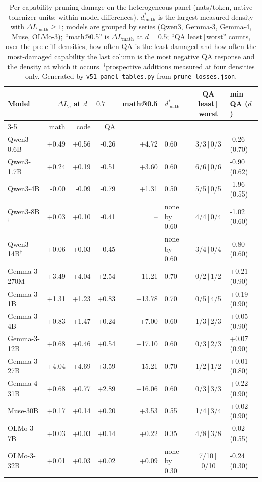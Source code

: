 \begin{table}[t]\centering\footnotesize\setlength{\tabcolsep}{3.5pt}
\begin{tabular}{@{}lrrrrlcl@{}}
\toprule
Model & \multicolumn{3}{c}{$\Delta L_c$ at $d=0.7$} & math@0.5 & $d^{*}_{\mathrm{math}}$ & QA least$\,|\,$worst & min QA ($d$) \\
\cmidrule(lr){3-5} & math & code & QA & & & & \\
\midrule
Qwen3-0.6B & +0.49 & +0.56 & -0.26 & +4.72 & 0.60 & 3/3$\,|\,$0/3 & -0.26 (0.70) \\
Qwen3-1.7B & +0.24 & +0.19 & -0.51 & +3.60 & 0.60 & 6/6$\,|\,$0/6 & -0.90 (0.62) \\
Qwen3-4B & -0.00 & -0.09 & -0.79 & +1.31 & 0.50 & 5/5$\,|\,$0/5 & -1.96 (0.55) \\
Qwen3-8B$^{\dagger}$ & +0.03 & +0.10 & -0.41 & -- & none by 0.60 & 4/4$\,|\,$0/4 & -1.02 (0.60) \\
Qwen3-14B$^{\dagger}$ & +0.06 & +0.03 & -0.45 & -- & none by 0.60 & 3/4$\,|\,$0/4 & -0.80 (0.60) \\
Gemma-3-270M & +3.49 & +4.04 & +2.54 & +11.21 & 0.70 & 0/2$\,|\,$1/2 & +0.21 (0.90) \\
Gemma-3-1B & +1.31 & +1.23 & +0.83 & +13.78 & 0.70 & 0/5$\,|\,$4/5 & +0.19 (0.90) \\
Gemma-3-4B & +0.83 & +1.47 & +0.24 & +7.00 & 0.60 & 1/3$\,|\,$2/3 & +0.05 (0.90) \\
Gemma-3-12B & +0.68 & +0.46 & +0.54 & +17.10 & 0.60 & 0/3$\,|\,$2/3 & +0.07 (0.90) \\
Gemma-3-27B & +4.04 & +4.69 & +3.59 & +15.21 & 0.70 & 1/2$\,|\,$1/2 & +0.01 (0.80) \\
Gemma-4-31B & +0.68 & +0.77 & +2.89 & +16.06 & 0.60 & 0/3$\,|\,$3/3 & +0.22 (0.90) \\
Muse-30B & +0.17 & +0.14 & +0.20 & +3.53 & 0.55 & 1/4$\,|\,$3/4 & +0.02 (0.90) \\
OLMo-3-7B & +0.03 & +0.03 & +0.14 & +0.22 & 0.35 & 4/8$\,|\,$3/8 & -0.02 (0.55) \\
OLMo-3-32B & +0.01 & +0.03 & +0.02 & +0.09 & none by 0.30 & 7/10$\,|\,$0/10 & -0.24 (0.30) \\
\bottomrule\end{tabular}
\caption{Per-capability pruning damage on the heterogeneous panel (nats/token, native tokenizer units; within-model differences). $d^{*}_{\mathrm{math}}$ is the largest measured density with $\Delta L_{\mathrm{math}}\ge 1$; models are grouped by series (Qwen3, Gemma-3, Gemma-4, Muse, OLMo-3); ``math@0.5'' is $\Delta L_{\mathrm{math}}$ at $d=0.5$; ``QA least$\,|\,$worst'' counts, over the pre-cliff densities, how often QA is the least-damaged and how often the most-damaged capability the last column is the most negative QA response and the density at which it occurs. $^{\dagger}$prospective additions measured at four densities only. Generated by \texttt{v51\_panel\_tables.py} from \texttt{prune\_losses.json}.}
\label{tab:panel_prune}\end{table}
